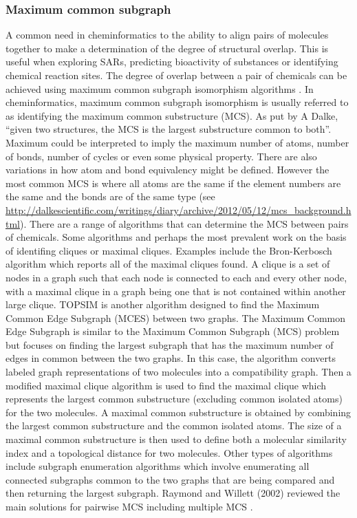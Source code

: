 \documentclass[
  super,
  preprint,
  3p]{elsarticle}
\begin{document}
\subsubsection{Maximum common subgraph}\label{maximum-common-subgraph}

A common need in cheminformatics to the ability to align pairs of
molecules together to make a determination of the degree of structural
overlap. This is useful when exploring SARs, predicting bioactivity of
substances or identifying chemical reaction sites. The degree of overlap
between a pair of chemicals can be achieved using maximum common
subgraph isomorphism algorithms
\citep{duesbury_maximum_2017, raymond_maximum_2002}. In cheminformatics,
maximum common subgraph isomorphism is usually referred to as
identifying the maximum common substructure (MCS). As put by A Dalke,
``given two structures, the MCS is the largest substructure common to
both''. Maximum could be interpreted to imply the maximum number of
atoms, number of bonds, number of cycles or even some physical property.
There are also variations in how atom and bond equivalency might be
defined. However the most common MCS is where all atoms are the same if
the element numbers are the same and the bonds are of the same type (see
\url{http://dalkescientific.com/writings/diary/archive/2012/05/12/mcs_background.html}).
There are a range of algorithms that can determine the MCS between pairs
of chemicals. Some algorithms and perhaps the most prevalent work on the
basis of identifing cliques or maximal cliques. Examples include the
Bron-Kerbosch algorithm \citep{bron_algorithm_1973} which reports all of
the maximal cliques found. A clique is a set of nodes in a graph such
that each node is connected to each and every other node, with a maximal
clique in a graph being one that is not contained within another large
clique. TOPSIM \citep{durand_efficient_1999} is another algorithm
designed to find the Maximum Common Edge Subgraph (MCES) between two
graphs. The Maximum Common Edge Subgraph is similar to the Maximum
Common Subgraph (MCS) problem but focuses on finding the largest
subgraph that has the maximum number of edges in common between the two
graphs. In this case, the algorithm converts labeled graph
representations of two molecules into a compatibility graph. Then a
modified maximal clique algorithm is used to find the maximal clique
which represents the largest common substructure (excluding common
isolated atoms) for the two molecules. A maximal common substructure is
obtained by combining the largest common substructure and the common
isolated atoms. The size of a maximal common substructure is then used
to define both a molecular similarity index and a topological distance
for two molecules. Other types of algorithms include subgraph
enumeration algorithms which involve enumerating all connected subgraphs
common to the two graphs that are being compared and then returning the
largest subgraph. Raymond and Willett (2002) reviewed the main solutions
for pairwise MCS \citep{raymond_maximum_2002} including multiple MCS
\citep{dalke_fmcs_2013}.
\end{document}

